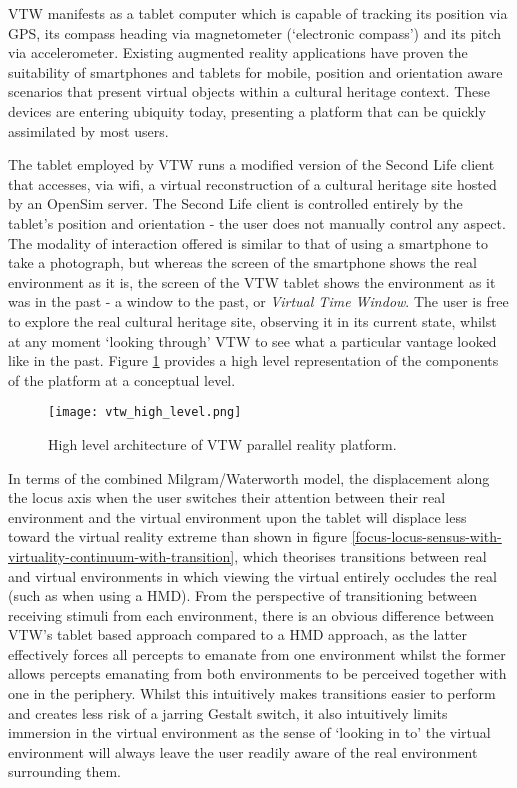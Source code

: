 VTW manifests as a tablet computer which is capable of tracking its position via GPS, its compass heading via magnetometer (`electronic compass') and its pitch via accelerometer. Existing augmented reality applications have proven the suitability of smartphones and tablets for mobile, position and orientation aware scenarios that present virtual objects within a cultural heritage context. These devices are entering ubiquity today, presenting a platform that can be quickly assimilated by most users.

The tablet employed by VTW runs a modified version of the Second Life client that accesses, via wifi, a virtual reconstruction of a cultural heritage site hosted by an OpenSim server. The Second Life client is controlled entirely by the tablet's position and orientation - the user does not manually control any aspect. The modality of interaction offered is similar to that of using a smartphone to take a photograph, but whereas the screen of the smartphone shows the real environment as it is, the screen of the VTW tablet shows the environment as it was in the past - a window to the past, or \textit{Virtual Time Window}. The user is free to explore the real cultural heritage site, observing it in its current state, whilst at any moment `looking through' VTW to see what a particular vantage looked like in the past. Figure \ref{vtw_high_level.png} provides a high level representation of the components of the platform at a conceptual level.

\begin{figure}[h]
\centering
  \texttt{[image: vtw\_high\_level.png]}
  \caption{High level architecture of VTW parallel reality platform.}
  \label{vtw_high_level.png}
\end{figure}

In terms of the combined Milgram/Waterworth model, the displacement along the locus axis when the user switches their attention between their real environment and the virtual environment upon the tablet will displace less toward the virtual reality extreme than shown in figure \ref{focus-locus-sensus-with-virtuality-continuum-with-transition}, which theorises transitions between real and virtual environments in which viewing the virtual entirely occludes the real (such as when using a HMD). From the perspective of transitioning between receiving stimuli from each environment, there is an obvious difference between VTW's tablet based approach compared to a HMD approach, as the latter effectively forces all percepts to emanate from one environment whilst the former allows percepts emanating from both environments to be perceived together with one in the periphery. Whilst this intuitively makes transitions easier to perform and creates less risk of a jarring Gestalt switch, it also intuitively limits immersion in the virtual environment as the sense of `looking in to' the virtual environment will always leave the user readily aware of the real environment surrounding them.

